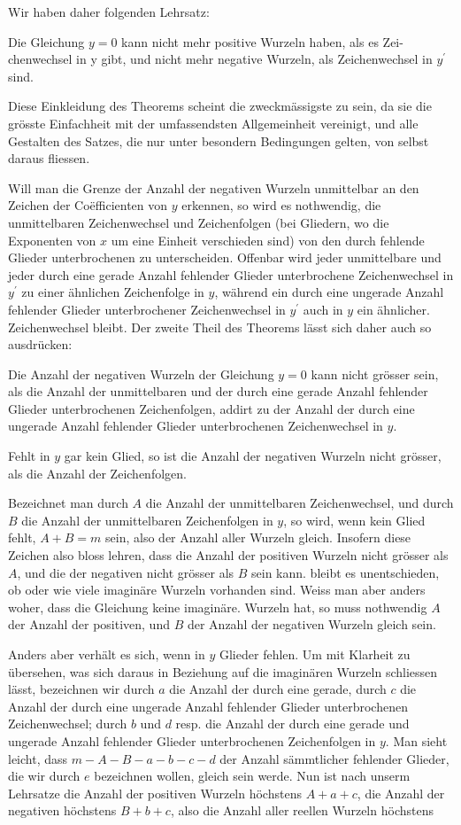 \documentclass[twoside,12pt, showframe]{memoir}
\begin{document}
Wir haben daher folgenden Lehrsatz:

Die Gleichung \(y=0\) kann nicht mehr positive Wurzeln haben, als es Zei- chenwechsel in y gibt, und nicht mehr negative Wurzeln, als Zeichenwechsel in \(y^{\prime}\) sind.

Diese Einkleidung des Theorems scheint die zweckmässigste zu sein, da sie die grösste Einfachheit mit der umfassendsten Allgemeinheit vereinigt, und alle Gestalten des Satzes, die nur unter besondern Bedingungen gelten, von selbst daraus fliessen.

Will man die Grenze der Anzahl der negativen Wurzeln unmittelbar an den Zeichen der Coëfficienten von \(y\) erkennen, so wird es nothwendig, die unmittelbaren Zeichenwechsel und Zeichenfolgen (bei Gliedern, wo die Exponenten von \(x\) um eine Einheit verschieden sind) von den durch fehlende Glieder unterbrochenen zu unterscheiden. Offenbar wird jeder unmittelbare und jeder durch eine gerade Anzahl fehlender Glieder unterbrochene Zeichenwechsel in \(y^{\prime}\) zu einer ähnlichen Zeichenfolge in \(y\), während ein durch eine ungerade Anzahl fehlender Glieder unterbrochener Zeichenwechsel in \(y^{\prime}\) auch in \(y\) ein ähnlicher. Zeichenwechsel bleibt. Der zweite Theil des Theorems lässt sich daher auch so ausdrücken:

Die Anzahl der negativen Wurzeln der Gleichung \(y=0\) kann nicht grösser sein, als die Anzahl der unmittelbaren und der durch eine gerade Anzahl fehlender Glieder unterbrochenen Zeichenfolgen, addirt zu der Anzahl der durch eine ungerade Anzahl fehlender Glieder unterbrochenen Zeichenwechsel in \(y\).

Fehlt in \(y\) gar kein Glied, so ist die Anzahl der negativen Wurzeln nicht grösser, als die Anzahl der Zeichenfolgen.

Bezeichnet man durch \(A\) die Anzahl der unmittelbaren Zeichenwechsel, und durch \(B\) die Anzahl der unmittelbaren Zeichenfolgen in \(y\), so wird, wenn kein Glied fehlt, \(A+B=m\) sein, also der Anzahl aller Wurzeln gleich. Insofern diese Zeichen also bloss lehren, dass die Anzahl der positiven Wurzeln nicht grösser als \(A\), und die der negativen nicht grösser als \(B\) sein kann. bleibt es unentschieden, ob oder wie viele imaginäre Wurzeln vorhanden sind. Weiss man aber anders woher, dass die Gleichung keine imaginäre. Wurzeln hat, so muss nothwendig \(A\) der Anzahl der positiven, und \(B\) der Anzahl der negativen Wurzeln gleich sein.

Anders aber verhält es sich, wenn in \(y\) Glieder fehlen. Um mit Klarheit
zu übersehen, was sich daraus in Beziehung auf die imaginären Wurzeln schliessen lässt, bezeichnen wir durch \(a\) die Anzahl der durch eine gerade, durch \(c\) die Anzahl der durch eine ungerade Anzahl fehlender Glieder unterbrochenen Zeichenwechsel; durch \(b\) und \(d\) resp. die Anzahl der durch eine gerade und ungerade Anzahl fehlender Glieder unterbrochenen Zeichenfolgen in \(y\). Man sieht leicht, dass \(m-A-B-a-b-c-d\) der Anzahl sämmtlicher fehlender Glieder, die wir durch \(e\) bezeichnen wollen, gleich sein werde. Nun ist nach unserm Lehrsatze die Anzahl der positiven Wurzeln höchstens \(A+a+c\), die Anzahl der negativen höchstens \(B+b+c\), also die Anzahl aller reellen Wurzeln höchstens
\end{document}
